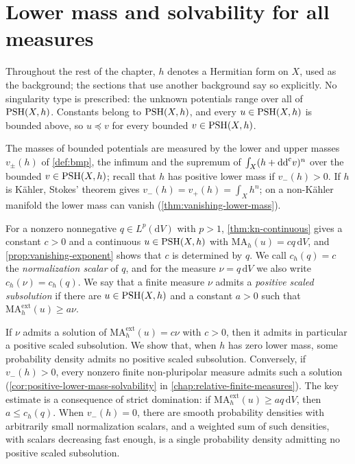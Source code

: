 \section{Lower mass and solvability for all measures}
\label{sec:lower-mass-solvability}

Throughout the rest of the chapter, $h$ denotes a Hermitian form on $X$, used as the background; the sections that use another background say so explicitly. No singularity type is prescribed: the unknown potentials range over all of $\mathrm{PSH}(X,h)$. Constants belong to $\mathrm{PSH}(X,h)$, and every $u\in\mathrm{PSH}(X,h)$ is bounded above, so $u\preceq v$ for every bounded $v\in\mathrm{PSH}(X,h)$.

The masses of bounded potentials are measured by the lower and upper masses $v_\pm(h)$ of \cref{def:bmp}, the infimum and the supremum of $\int_X(h+\mathrm{dd}^{\mathrm{c}} v)^n$ over the bounded $v\in\mathrm{PSH}(X,h)$; recall that $h$ has positive lower mass if $v_-(h)>0$. If $h$ is K\"ahler, Stokes' theorem gives $v_-(h)=v_+(h)=\int_Xh^n$; on a non-K\"ahler manifold the lower mass can vanish (\cref{thm:vanishing-lower-mass}).

For a nonzero nonnegative $q\in L^p(\mathrm{d}V)$ with $p>1$, \cref{thm:kn-continuous} gives a constant $c>0$ and a continuous $u\in\mathrm{PSH}(X,h)$ with $\mathrm{MA}_h(u)=cq\,\mathrm{d}V$, and \cref{prop:vanishing-exponent} shows that $c$ is determined by $q$. We call $c_h(q)=c$ the \emph{normalization scalar} of $q$, and for the measure $\nu=q\,\mathrm{d}V$ we also write $c_h(\nu)=c_h(q)$. We say that a finite measure $\nu$ admits a \emph{positive scaled subsolution} if there are $u\in\mathrm{PSH}(X,h)$ and a constant $a>0$ such that $\mathrm{MA}^{\mathrm{ext}}_h(u)\geq a\nu$.

If $\nu$ admits a solution of $\mathrm{MA}^{\mathrm{ext}}_h(u)=c\nu$ with $c>0$, then it admits in particular a positive scaled subsolution. We show that, when $h$ has zero lower mass, some probability density admits no positive scaled subsolution. Conversely, if $v_-(h)>0$, every nonzero finite non-pluripolar measure admits such a solution (\cref{cor:positive-lower-mass-solvability} in \cref{chap:relative-finite-measures}). The key estimate is a consequence of strict domination: if $\mathrm{MA}^{\mathrm{ext}}_h(u)\geq aq\,\mathrm{d}V$, then $a\leq c_h(q)$. When $v_-(h)=0$, there are smooth probability densities with arbitrarily small normalization scalars, and a weighted sum of such densities, with scalars decreasing fast enough, is a single probability density admitting no positive scaled subsolution.

